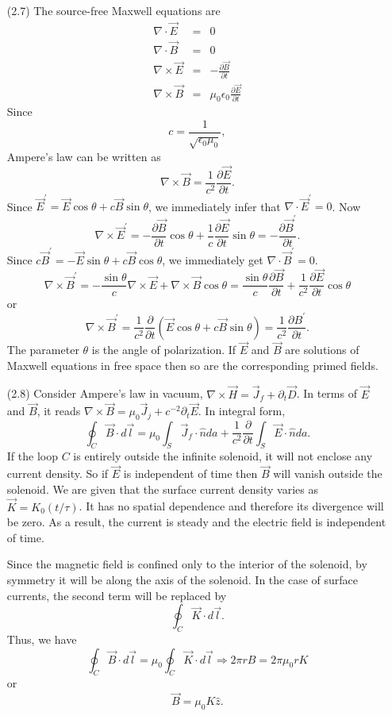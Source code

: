 \documentclass{article}
\newcommand{\un}{\hat{n}}
\begin{document}
\begin{enumerate}
\item[(2.7)] The source-free Maxwell equations are
\begin{eqnarray*}
\nabla\cdot\vec{E} &=& 0 \\
\nabla\cdot\vec{B} &=& 0 \\
\nabla\times\vec{E} &=& -\frac{\partial\vec{B}}{\partial t} \\
\nabla\times\vec{B} &=& \mu_0\epsilon_0\frac{\partial\vec{E}}{\partial t}
\end{eqnarray*}
Since
\[
c = \frac{1}{\sqrt{\epsilon_0\mu_0}},
\]
Ampere's law can be written as
\[
\nabla\times\vec{B} = \frac{1}{c^2}\frac{\partial\vec{E}}{\partial t}.
\]
Since $\vec{E}^\prime = \vec{E}\cos\theta + c\vec{B}\sin\theta$, we immediately infer that $\nabla\cdot\vec{E}^\prime=0$. Now
\[
\nabla\times\vec{E}^\prime = -\frac{\partial\vec{B}}{\partial t}\cos\theta + \frac{1}{c}\frac{\partial\vec{E}}{\partial t}
\sin\theta = -\frac{\partial\vec{B}^\prime}{\partial t}.
\]
Since $c\vec{B}^\prime = -\vec{E}\sin\theta + c\vec{B}\cos\theta$, we immediately get $\nabla\cdot\vec{B}^\prime = 0$.
\[
\nabla\times \vec{B}^\prime = -\frac{\sin\theta}{c}\nabla\times\vec{E} + \nabla\times\vec{B}\cos\theta = 
\frac{\sin\theta}{c}\frac{\partial\vec{B}}{\partial t} + \frac{1}{c^2}\frac{\partial\vec{E}}{\partial t}\cos\theta
\]
or
\[
\nabla\times \vec{B}^\prime = \frac{1}{c^2}\frac{\partial}{\partial t}(\vec{E}\cos\theta + c\vec{B}\sin\theta)
= \frac{1}{c^2}\frac{\partial B^\prime}{\partial t}.
\]
The parameter $\theta$ is the angle of polarization. If $\vec{E}$ and $\vec{B}$ are solutions of Maxwell equations in free
space then so are the corresponding primed fields.

\item[(2.8)] Consider Ampere's law in vacuum, $\nabla\times\vec{H} = \vec{J}_f + \partial_t\vec{D}$. In terms of $\vec{E}$
and $\vec{B}$, it reads $\nabla\times\vec{B} = \mu_0\vec{J}_j + c^{-2}\partial_t\vec{E}$. In integral form,
\[
\oint_C\vec{B}\cdot d\vec{l} = \mu_0\int_S\vec{J}_f\cdot\un da + \frac{1}{c^2}\frac{\partial}{\partial t}\int_S\vec{E}\cdot\un da.
\]
If the loop $C$ is entirely outside the infinite solenoid, it will not enclose any current density. So if $\vec{E}$ is
independent of time then $\vec{B}$ will vanish outside the solenoid. We are given that the surface current density varies
as $\vec{K} = K_0(t/\tau)$. It has no spatial dependence and therefore its divergence will be zero. As a result, the current
is steady and the electric field is independent of time.

Since the magnetic field is confined only to the interior of the solenoid, by symmetry it will be along the axis of the 
solenoid. In the case of surface currents, the second term will be replaced by
\[
\oint_C \vec{K}\cdot d\vec{l}.
\]
Thus, we have
\[
\oint_C\vec{B}\cdot d\vec{l} = \mu_0\oint_C \vec{K}\cdot d\vec{l} \Rightarrow 2\pi rB = 2\pi\mu_0 r K
\]
or
\begin{equation}
\vec{B} = \mu_0 K \hat{z}.
\end{equation}


\end{enumerate}
\end{document}
